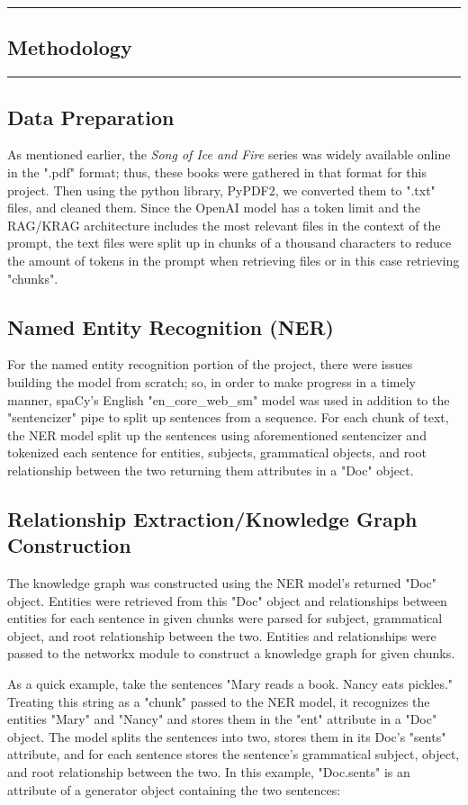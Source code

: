 {\color{gray}\hrule}
\begin{center}
\section{Methodology}
\bigskip
\end{center}
{\color{gray}\hrule}
\subsection{Data Preparation}

As mentioned earlier, the \textit{Song of Ice and Fire} series was widely available online in the ".pdf" format; thus, these books were gathered in that format for this project. Then using the python library, PyPDF2, we converted them to ".txt" files, and cleaned them. Since the OpenAI model has a token limit and the RAG/KRAG architecture includes the most relevant files in the context of the prompt, the text files were split up in chunks of a thousand characters to reduce the amount of tokens in the prompt when retrieving files or in this case retrieving "chunks".

\subsection{Named Entity Recognition (NER)}

For the named entity recognition portion of the project, there were issues building the model from scratch; so, in order to make progress in a timely manner, spaCy's English "en\_core\_web\_sm" model was used in addition to the "sentencizer" pipe to split up sentences from a sequence. For each chunk of text, the NER model split up the sentences using aforementioned sentencizer and tokenized each sentence for entities, subjects, grammatical objects, and root relationship between the two returning them attributes in a "Doc" object.

\subsection{Relationship Extraction/Knowledge Graph Construction}

The knowledge graph was constructed using the NER model's returned "Doc" object. Entities were retrieved from this "Doc" object and relationships between entities for each sentence in given chunks were parsed for subject, grammatical object, and root relationship between the two. Entities and relationships were passed to the networkx module to construct a knowledge graph for given chunks.
\par
As a quick example, take the sentences "Mary reads a book. Nancy eats pickles." Treating this string as a "chunk" passed to the NER model, it recognizes the entities "Mary" and "Nancy" and stores them in the "ent" attribute in a "Doc" object. The model splits the sentences into two, stores them in its Doc's "sents" attribute, and for each sentence stores the sentence's grammatical subject, object, and root relationship between the two. In this example, "Doc.sents" is an attribute of a generator object containing the two sentences: \bigskip

